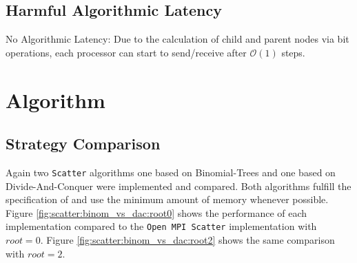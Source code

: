\subsection{Harmful Algorithmic Latency}
No Algorithmic Latency: Due to the calculation of child and parent nodes via bit operations, each processor can start to send/receive after $\mathcal{O}(1)$ steps.


\section{Algorithm \myscatter}

\subsection{Strategy Comparison}
Again two \texttt{Scatter} algorithms one based on Binomial-Trees and one based on Divide-And-Conquer were implemented and compared. Both algorithms fulfill the specification of \mpigather and use the minimum amount of memory whenever possible. Figure \ref{fig:scatter:binom_vs_dac:root0} shows the performance of each implementation compared to the \texttt{Open MPI Scatter} implementation with $root = 0$. Figure \ref{fig:scatter:binom_vs_dac:root2} shows the same comparison with $root = 2$.

